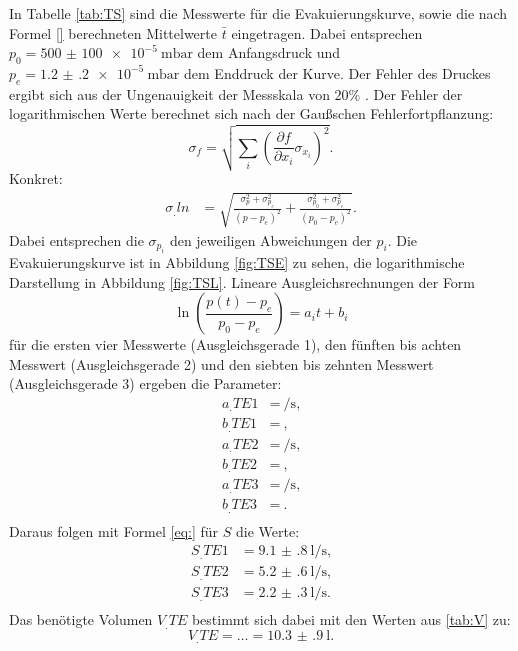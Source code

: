 In Tabelle \ref{tab:TS} sind die Messwerte für die Evakuierungskurve, sowie die nach Formel \eqref{} berechneten Mittelwerte $\bar{t}$ eingetragen.
Dabei entsprechen $p_0=\SI{500(100)e-5}{\milli\bar}$ dem Anfangsdruck und $p_e=\SI{1.2(2)e-5}{\milli\bar}$ dem Enddruck der Kurve. Der Fehler des Druckes ergibt sich aus der Ungenauigkeit der Messskala von $20\%$ \cite{V70}. 
Der Fehler der logarithmischen Werte berechnet sich nach der Gaußschen Fehlerfortpflanzung:
\[
\sigma_f = \sqrt{\sum_i\left(\frac{\partial f}{\partial x_i}\sigma_{x_i}\right)^2}\text{.}
\]
Konkret:
\begin{align*}
\sigma_.{ln}	&=\sqrt{\frac{\sigma_p^2+\sigma_{p_e}^2}{(p-p_e)^2}+\frac{\sigma_{p_0}^2+\sigma_{p_e}^2}{(p_0-p_e)^2}}\text{.}
\end{align*}
Dabei entsprechen die $\sigma_{p_i}$ den jeweiligen Abweichungen der $p_i$.
Die Evakuierungskurve ist in Abbildung \ref{fig:TSE} zu sehen, die logarithmische Darstellung in Abbildung \ref{fig:TSL}.
Lineare Ausgleichsrechnungen der Form
\[
\ln\left(\frac{p(t)-p_e}{p_0-p_e}\right) = a_it+b_i
\]
für die ersten vier Messwerte (Ausgleichsgerade 1), den fünften bis achten Messwert (Ausgleichsgerade 2) und den siebten bis zehnten Messwert (Ausgleichsgerade 3) ergeben die Parameter:
\begin{align*}
a_.{TE1} &= \SI{}{\per\second} \text{,}\\
b_.{TE1} &= \SI{}{} \text{,}\\
a_.{TE2} &= \SI{}{\per\second} \text{,}\\
b_.{TE2} &= \SI{}{} \text{,}\\
a_.{TE3} &= \SI{}{\per\second} \text{,}\\
b_.{TE3} &= \SI{}{} \text{.}\\
\end{align*} 
Daraus folgen mit Formel \eqref{eq:} für $S$ die Werte:
\begin{align*}
S_.{TE1} &= \SI{9.1(8)}{\litre\per\second} \text{,}\\
S_.{TE2} &= \SI{5.2(6)}{\litre\per\second} \text{,}\\
S_.{TE3} &= \SI{2.2(3)}{\litre\per\second} \text{.}\\
\end{align*} 
Das benötigte Volumen $V_.{TE}$ bestimmt sich dabei mit den Werten aus \ref{tab:V} zu:
\[
V_.{TE} = \dots = \SI{10.3(9)}{\litre}\text{.}
\]

